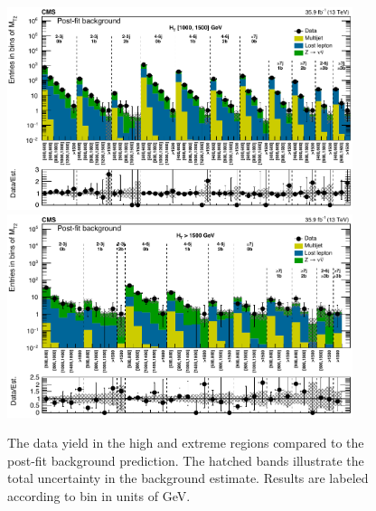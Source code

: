 \begin{figure}
	\centering
	\includegraphics[width=0.90\textwidth]{results/figs/postfit/mt2_highHT_fullEstimate}
	\includegraphics[width=0.90\textwidth]{results/figs/postfit/mt2_extremeHT_fullEstimate}
	\renewcommand{\baselinestretch}{1.0}
	\caption[The data yield in the high \HT and extreme \HT regions compared to the post-fit background prediction.]{The data yield in the high \HT and extreme \HT regions compared to the post-fit background prediction. The hatched bands illustrate the total uncertainty in the background estimate. Results are labeled according to \mttwo bin in units of GeV.}
	\label{fig:yieldPostfit3}
\end{figure}
